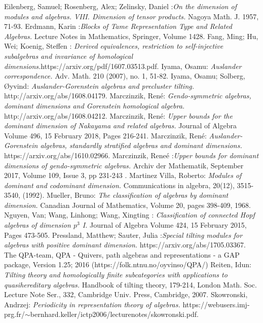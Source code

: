 \documentclass[a4paper]{amsart}
\theoremstyle{definition}
\theoremstyle{remark}
\numberwithin{equation}{theorem}
\begin{document}
\begin{thebibliography}{Gus}
 Eilenberg, Samuel; Rosenberg, Alex; Zelinsky, Daniel :{\it On the dimension of modules and algebras. VIII. Dimension of tensor products.} Nagoya Math. J. 1957, 71-93.
 Erdmann, Karin :{\it Blocks of Tame Representation Type and Related Algebras.} Lecture Notes in Mathematics, Springer, Volume 1428.
 Fang, Ming; Hu, Wei; Koenig, Steffen : {\it Derived equivalences, restriction to self-injective subalgebras and invariance of homological dimensions.}https://arxiv.org/pdf/1607.03513.pdf.
 Iyama, Osamu: {\it Auslander correspondence.} Adv. Math. 210 (2007), no. 1, 51-82. 
 Iyama, Osamu; Solberg, {{\O}}yvind: {\it Auslander-Gorenstein algebras and precluster tilting.} http://arxiv.org/abs/1608.04179.
 Marczinzik, Ren\'e: {\it Gendo-symmetric algebras, dominant dimensions and Gorenstein homological algebra.} http://arxiv.org/abs/1608.04212.
 Marczinzik, Ren\'e: {\it Upper bounds for the dominant dimension of Nakayama and related algebras.} Journal of Algebra
Volume 496, 15 February 2018, Pages 216-241.
 Marczinzik, Ren\'e: {\it Auslander-Gorenstein algebras, standardly stratified algebras and dominant dimensions.} https://arxiv.org/abs/1610.02966.
 Marczinzik, Rene\'e :{\it Upper bounds for dominant dimensions of gendo-symmetric algebras.} Archiv der Mathematik, September 2017, Volume 109, Issue 3, pp 231-243 .
 Martinez Villa, Roberto: {\it Modules of dominant and codominant dimension.} Communications in algebra, 20(12), 3515-3540, (1992).
 Mueller, Bruno: {\it The classification of algebras by dominant dimension.} Canadian Journal of Mathematics, Volume 20, pages 398-409, 1968.
 Nguyen, Van; Wang, Linhong; Wang, Xingting : {\it Classification of connected Hopf algebras of dimension $p^3$ I.} Journal of Algebra
Volume 424, 15 February 2015, Pages 473-505.
 Pressland, Matthew; Sauter, Julia :{\it  Special tilting modules for algebras with positive dominant dimension.} https://arxiv.org/abs/1705.03367.
 The QPA-team, QPA - Quivers, path algebras and representations - a GAP package, Version 1.25; 2016 (https://folk.ntnu.no/oyvinso/QPA/)
 Reiten, Idun: {\it  Tilting theory and homologically finite subcategories with applications to quasihereditary algebras.} Handbook of tilting theory, 179-214, London Math. Soc. Lecture Note Ser., 332, Cambridge Univ. Press, Cambridge, 2007.
 Skowronski, Andrzej: {\it Periodicity in representation theory of algebras.} https://webusers.imj-prg.fr/$\sim$bernhard.keller/ictp2006/lecturenotes/skowronski.pdf.

\end{thebibliography}
\end{document}
